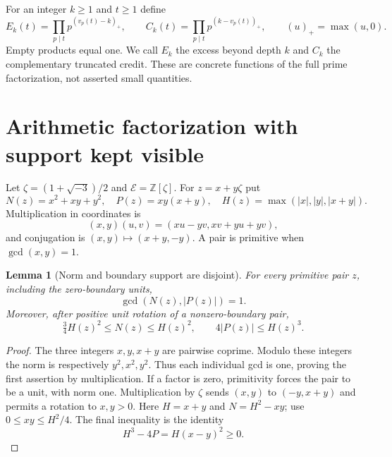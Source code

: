 \documentclass[11pt]{amsart}
\newtheorem{lemma}[theorem]{Lemma}
\theoremstyle{definition}\newtheorem{definition}[theorem]{Definition}
\theoremstyle{remark}\newtheorem{remark}[theorem]{Remark}
\newcommand{\Z}{\mathbb Z}\newcommand{\Q}{\mathbb Q}\newcommand{\N}{\mathbb N}
\newcommand{\EE}{\mathcal E}\newcommand{\HH}{\mathcal A}
\begin{document}
For an integer $k\ge1$ and $t\ge1$ define
\[
 E_k(t)=\prod_{p\mid t}p^{(v_p(t)-k)_+},\qquad
 C_k(t)=\prod_{p\mid t}p^{(k-v_p(t))_+},\qquad (u)_+=\max(u,0).
\]
Empty products equal one. We call $E_k$ the excess beyond depth $k$ and $C_k$ the complementary truncated credit. These are concrete functions of the full prime factorization, not asserted small quantities.

\section{Arithmetic factorization with support kept visible}
Let $\zeta=(1+\sqrt{-3})/2$ and $\EE=\Z[\zeta]$. For $z=x+y\zeta$ put
\[
 N(z)=x^2+xy+y^2,\quad P(z)=xy(x+y),\quad
 H(z)=\max(|x|,|y|,|x+y|).
\]
Multiplication in coordinates is
\[
 (x,y)(u,v)=(xu-yv,xv+yu+yv),
\]
and conjugation is $(x,y)\mapsto(x+y,-y)$. A pair is primitive when $\gcd(x,y)=1$.

\begin{lemma}[Norm and boundary support are disjoint]\label{lem:disjoint}
For every primitive pair $z$, including the zero-boundary units,
\[
 \gcd(N(z),|P(z)|)=1.
\]
Moreover, after positive unit rotation of a nonzero-boundary pair,
\begin{equation}\label{eq:geometry}
 \tfrac34H(z)^2\le N(z)\le H(z)^2,
 \qquad 4|P(z)|\le H(z)^3.
\end{equation}
\end{lemma}
\begin{proof}
The three integers $x,y,x+y$ are pairwise coprime. Modulo these integers the norm is respectively $y^2,x^2,y^2$. Thus each individual gcd is one, proving the first assertion by multiplication. If a factor is zero, primitivity forces the pair to be a unit, with norm one.
Multiplication by $\zeta$ sends $(x,y)$ to $(-y,x+y)$ and permits a rotation to $x,y>0$. Here $H=x+y$ and $N=H^2-xy$; use $0\le xy\le H^2/4$. The final inequality is the identity
\[
 H^3-4P=H(x-y)^2\ge0.
\]
\end{proof}
\end{document}

